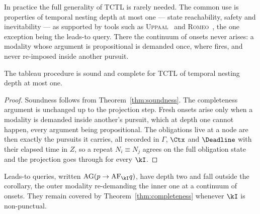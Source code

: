 In practice the full generality of TCTL is rarely needed. The common use is properties of temporal
nesting depth at most one --- state reachability, safety and inevitability --- as supported by tools
such as \textsc{Uppaal}~\cite{BehrmannLarsenYi2004Uppaal} and \textsc{Romeo}~\cite{lime-TACAS-09}, the
one exception being the leads-to query. There the continuum of onsets never arises: a modality whose
argument is propositional is demanded once, where  fires, and never re-imposed inside
another pursuit.

\begin{corollary}\label{cor:depthone}
The tableau procedure is sound and complete for TCTL of temporal nesting depth at most one.
\end{corollary}
\begin{proof}
Soundness follows from Theorem~\ref{thm:soundness}. The completeness argument is unchanged up to the
projection step. Fresh onsets arise only when a modality is demanded inside another's pursuit, which
at depth one cannot happen, every argument being propositional. The obligations live at a node are
then exactly the pursuits it carries, all recorded in $\Gamma$, $\Ctx$ and $\Deadline$ with their elapsed time
in $Z$, so a repeat $N_i\equiv N_j$ agrees on the full obligation state and the projection goes
through for every $\kI$.
\end{proof}

\noindent
Leads-to queries, written $\mathrm{AG}(p\rightarrow\mathrm{AF}_\kI q)$, have depth two and fall
outside the corollary, the outer modality re-demanding the inner one at a continuum of onsets. They
remain covered by Theorem~\ref{thm:completeness} whenever $\kI$ is non-punctual.
